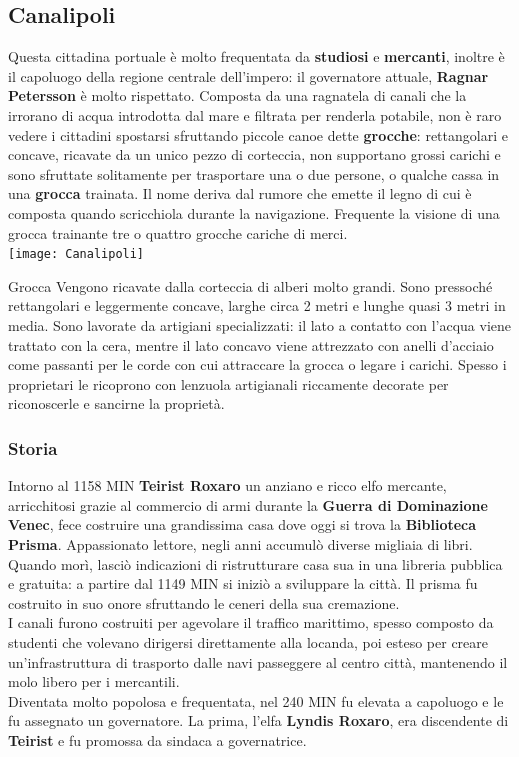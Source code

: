 \documentclass[10pt,twoside,onecolumn,openany]{book}
\begin{document}
\subsection{Canalipoli}
Questa cittadina portuale è molto frequentata da \textbf{studiosi} e \textbf{mercanti}, inoltre è il capoluogo della regione centrale dell'impero: il governatore attuale, \textbf{Ragnar Petersson} è molto rispettato.
Composta da una ragnatela di canali che la irrorano di acqua introdotta dal mare e filtrata per renderla potabile, non è raro vedere i cittadini spostarsi sfruttando piccole canoe dette \textbf{grocche}: rettangolari e concave, ricavate da un unico pezzo di corteccia, non supportano grossi carichi e sono sfruttate solitamente per trasportare una o due persone, o qualche cassa in una \textbf{grocca} trainata. Il nome deriva dal rumore che emette il legno di cui è composta quando scricchiola durante la navigazione. Frequente la visione di una grocca trainante tre o quattro grocche cariche di merci.\\
\texttt{[image: Canalipoli]}
\begin{paperbox}{{Grocca}}
Vengono ricavate dalla corteccia di alberi molto grandi. Sono pressoché rettangolari e leggermente concave, larghe circa 2 metri e lunghe quasi 3 metri in media. Sono lavorate da artigiani specializzati: il lato a contatto con l'acqua viene trattato con la cera, mentre il lato concavo viene attrezzato con anelli d'acciaio come passanti per le corde con cui attraccare la grocca o legare i carichi. Spesso i proprietari le ricoprono con lenzuola artigianali riccamente decorate per riconoscerle e sancirne la proprietà.
\end{paperbox}
\newpage
\subsubsection{Storia}
Intorno al 1158 MIN \textbf{Teirist Roxaro} un anziano e ricco elfo mercante, arricchitosi grazie al commercio di armi durante la \textbf{Guerra di Dominazione Venec}, fece costruire una grandissima casa dove oggi si trova la \textbf{Biblioteca Prisma}. Appassionato lettore, negli anni accumulò diverse migliaia di libri. Quando morì, lasciò indicazioni di ristrutturare casa sua in una libreria pubblica e gratuita: a partire dal 1149 MIN si iniziò a sviluppare la città. Il prisma fu costruito in suo onore sfruttando le ceneri della sua cremazione.\\
I canali furono costruiti per agevolare il traffico marittimo, spesso composto da studenti che volevano dirigersi direttamente alla locanda, poi esteso per creare un'infrastruttura di trasporto dalle navi passeggere al centro città, mantenendo il molo libero per i mercantili.\\
Diventata molto popolosa e frequentata, nel 240 MIN fu elevata a capoluogo e le fu assegnato un governatore. La prima, l'elfa \textbf{Lyndis Roxaro}, era discendente di \textbf{Teirist} e fu promossa da sindaca a governatrice.
\end{document}
